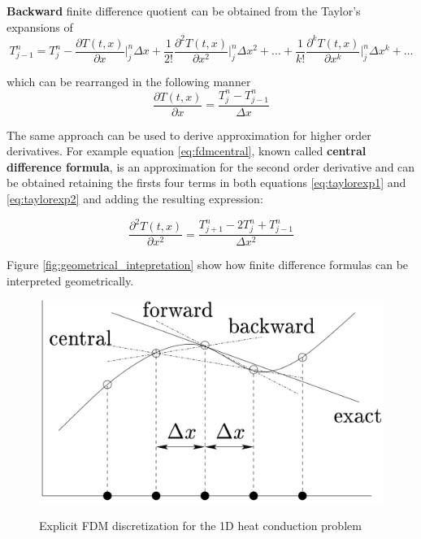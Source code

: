     \textbf{Backward} finite difference quotient can be obtained from the Taylor's expansions of    
        \begin{equation}
    T^n_{j-1} = T^n_{j} - 
    \frac{\partial T(t,x)}{\partial x}\bigg\rvert^n_j \Delta x +
    \frac{1}{2!}  \frac{\partial^2 T(t,x)}{\partial x^2}\bigg\rvert^n_j \Delta x^2 + \ldots + 
     \frac{1}{k!}  \frac{\partial^k T(t,x)}{\partial x^k}\bigg\rvert^n_j \Delta x^k + \ldots
     \label{eq:taylorexp2}
    \end{equation}
    
    which can be rearranged in the following manner
        \begin{equation}
    \frac{\partial T(t,x)}{\partial x}  = \frac{T^n_{j} - T^n_{j-1}}{\Delta x}
    \label{eq:fdmfbackward}
    \end{equation}
    
   The same approach can be used to derive approximation for higher order derivatives.
   For example equation \ref{eq:fdmcentral}, known called \textbf{central difference formula}, is an approximation for the second order derivative and can be obtained retaining the firsts four terms in both equations \ref{eq:taylorexp1} and \ref{eq:taylorexp2} and adding the resulting expression:
   
    \begin{equation}
		\frac{\partial^2 T(t,x)}{\partial x^2} = \frac{T^n_{j+1}- 2T^n_{j} + T^n_{j-1}}{\Delta x^2}
		\label{eq:fdmcentral}
    \end{equation}
    
    Figure \ref{fig:geometrical_intepretation} show how finite difference formulas can be interpreted geometrically.
    \begin{figure}
\centering
\includegraphics[scale=0.3]{./images/CA_FDM/geometrical_interpretation_fd}
\label{fig:geometrical_intepretation}
\caption{Explicit FDM discretization for the 1D heat conduction problem}\label{torus}
\end{figure} 
    
